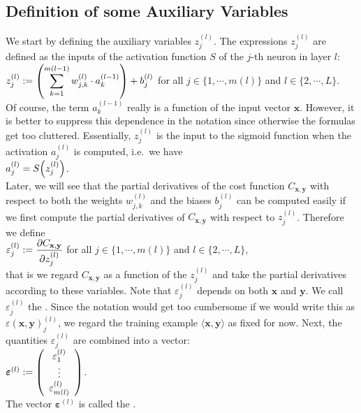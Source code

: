 \subsection{Definition of some Auxiliary Variables}
We start by defining the auxiliary variables $z_j^{(l)}$.
 The expressions $z_j^{(l)}$  are defined as the inputs of the activation function $S$ of the $j$-th neuron in
 layer $l$:
\\[0.2cm]
\hspace*{1.3cm}
$\displaystyle z_j^{(l)} := \left(\sum\limits_{k=1}^{m(l-1)}  w_{j,k}^{(l)} \cdot a_k^{(l-1)}\right) + b_j^{(l)}$
\quad for all  $j \in \{1, \cdots, m(l)\}$ and $l \in \{2,\cdots,L\}$.
\\[0.2cm]
Of course, the term  $a_k^{(l-1)}$ really is a function of the input vector $\mathbf{x}$.  However, it is better to suppress
this dependence in the notation since otherwise the formulas get too cluttered.
Essentially, $z_j^{(l)}$ is the input to the sigmoid function when the activation $a_j^{(l)}$ is computed,
i.e.~we have
\\[0.2cm]
\hspace*{1.3cm}
$a_j^{(l)} = S\Bigl(z_j^{(l)}\Bigr)$.
\\[0.2cm]
Later, we will see that the partial derivatives of the cost function $C_{\mathbf{x}, \mathbf{y}}$ with respect to both the weights
$w_{j,k}^{(l)}$ and the biases $b_j^{(l)}$ can be computed easily if we first compute the partial derivatives
of $C_{\mathbf{x}, \mathbf{y}}$ with respect to $z_j^{(l)}$.  Therefore we define
\\[0.2cm]
\hspace*{1.3cm}
$\displaystyle\varepsilon_j^{(l)} := \frac{\partial C_{\mathbf{x}, \mathbf{y}}}{\partial z_j^{(l)}}$ \quad for all $j \in \{1, \cdots, m(l)\}$ and $l \in \{2,\cdots, L\}$,
\\[0.2cm]
that is we regard $C_{\mathbf{x}, \mathbf{y}}$ as a function of the $z_j^{(l)}$ and take the partial
derivatives according to these variables.  
Note that $\varepsilon_j^{(l)}$ depends on both $\mathbf{x}$ and $\mathbf{y}$.  
We call  $\varepsilon_j^{(l)}$ the . 
Since the notation would
get too cumbersome if we would write this as $\varepsilon(\mathbf{x}, \mathbf{y})_j^{(l)}$, we regard the training
example $\langle\mathbf{x}, \mathbf{y}\rangle$ as fixed for now.  Next, the quantities $\varepsilon_j^{(l)}$ are combined into a vector:
\\[0.2cm]
\hspace*{1.3cm}
$\boldsymbol{\varepsilon}^{(l)} := \left(
  \begin{array}[c]{c}
    \varepsilon_1^{(l)}      \\
    \vdots             \\
    \varepsilon_{m(l)}^{(l)}  
  \end{array}
  \right)
$.
\\[0.2cm]
The vector $\boldsymbol{\varepsilon}^{(l)}$ is called the . 

